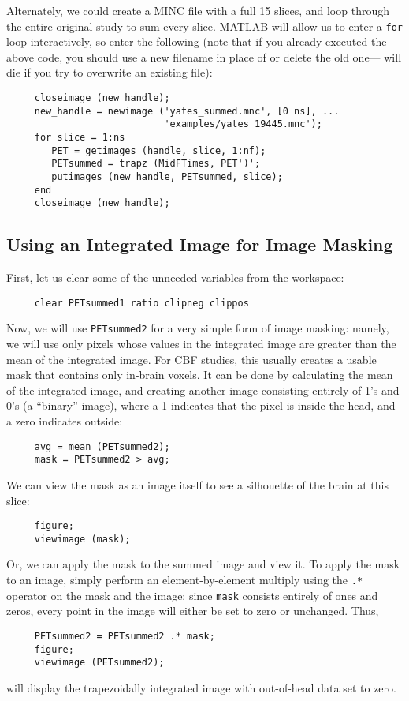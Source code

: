 Alternately, we could create a MINC file with a full 15 slices, and
loop through the entire original study to sum every slice.  MATLAB
will allow us to enter a \verb|for| loop interactively, so enter the
following (note that if you already executed the above code, you
should use a new filename in place of  or
delete the old one--- will die if you try to overwrite
an existing file):
\begin{verbatim}
     closeimage (new_handle);
     new_handle = newimage ('yates_summed.mnc', [0 ns], ...
                            'examples/yates_19445.mnc');
     for slice = 1:ns
        PET = getimages (handle, slice, 1:nf);
        PETsummed = trapz (MidFTimes, PET')';
        putimages (new_handle, PETsummed, slice);
     end
     closeimage (new_handle);
\end{verbatim}

\subsection{Using an Integrated Image for Image Masking}

First, let us clear some of the unneeded variables from the workspace:
\begin{verbatim}
     clear PETsummed1 ratio clipneg clippos
\end{verbatim}

Now, we will use \verb|PETsummed2| for a very simple form of image
masking: namely, we will use only pixels whose values in the
integrated image are greater than the mean of the integrated image.
For CBF studies, this usually creates a usable mask that contains only
in-brain voxels.  It can be done by calculating the mean of the
integrated image, and creating another image consisting entirely of
1's and 0's (a ``binary'' image), where a 1 indicates that the pixel
is inside the head, and a zero indicates outside:
\begin{verbatim}
     avg = mean (PETsummed2);
     mask = PETsummed2 > avg;
\end{verbatim}

We can view the mask as an image itself to see a silhouette of the
brain at this slice:
\begin{verbatim}
     figure;
     viewimage (mask);
\end{verbatim}
Or, we can apply the mask to the summed image and view it.  To apply
the mask to an image, simply perform an element-by-element multiply 
using the
\verb|.*| operator on the mask and the image; since \verb|mask|
consists entirely of ones and zeros, every point in the image will
either be set to zero or unchanged.  Thus,
\begin{verbatim}
     PETsummed2 = PETsummed2 .* mask;
     figure;
     viewimage (PETsummed2);
\end{verbatim}
will display the trapezoidally integrated image with out-of-head data
set to zero.

